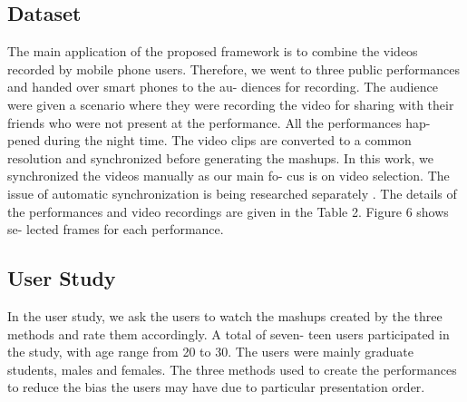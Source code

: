 \documentclass[conference]{IEEEtran}
\begin{document}



\subsection{Dataset}
The main application of the proposed framework is to combine
the videos recorded by mobile phone users. Therefore, we went to
three public performances and handed over smart phones to the au-
diences for recording. The audience were given a scenario where
they were recording the video for sharing with their friends who
were not present at the performance. All the performances hap-
pened during the night time. The video clips are converted to a
common resolution and synchronized before generating the mashups.
In this work, we synchronized the videos manually as our main fo-
cus is on video selection. The issue of automatic synchronization is
being researched separately \cite{14}. The details of the performances
and video recordings are given in the Table 2. Figure 6 shows se-
lected frames for each performance.

\subsection{User Study}
In the user study, we ask the users to watch the mashups created
by the three methods and rate them accordingly. A total of seven-
teen users participated in the study, with age range from 20 to 30.
The users were mainly graduate students, males and females. The
three methods used to create the performances to reduce the
bias the users may have due to particular presentation order.
\end{document}
